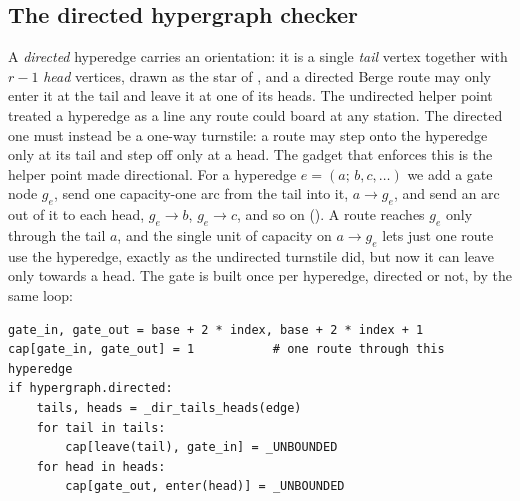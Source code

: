 \subsection{The directed hypergraph checker}
A \emph{directed} hyperedge carries an orientation: it is a single \emph{tail} vertex together with $r-1$ \emph{head} vertices, drawn as the star of , and a directed Berge route may only enter it at the tail and leave it at one of its heads. The undirected helper point treated a hyperedge as a line any route could board at any station. The directed one must instead be a one-way turnstile: a route may step onto the hyperedge only at its tail and step off only at a head. The gadget that enforces this is the helper point made directional. For a hyperedge $e = (a;\, b, c, \dots)$ we add a gate node $g_e$, send one capacity-one arc from the tail into it, $a \to g_e$, and send an arc out of it to each head, $g_e \to b$, $g_e \to c$, and so on (). A route reaches $g_e$ only through the tail $a$, and the single unit of capacity on $a \to g_e$ lets just one route use the hyperedge, exactly as the undirected turnstile did, but now it can leave only towards a head. The gate is built once per hyperedge, directed or not, by the same loop:

\begin{lstlisting}[caption={The gate loop behind \Cref{fig:hyper-gadget} and \Cref{fig:dir-hyper-gadget}: one capacity-one gate per hyperedge, wired one-way for a directed hyperedge and both ways for an undirected one.}, label={lst:gate}]
gate_in, gate_out = base + 2 * index, base + 2 * index + 1
cap[gate_in, gate_out] = 1           # one route through this hyperedge
if hypergraph.directed:
    tails, heads = _dir_tails_heads(edge)
    for tail in tails:
        cap[leave(tail), gate_in] = _UNBOUNDED
    for head in heads:
        cap[gate_out, enter(head)] = _UNBOUNDED
\end{lstlisting}

